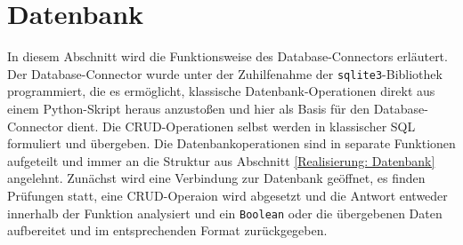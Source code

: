     \section{Datenbank} \label{Implementierung: Datenbank}
        In diesem Abschnitt wird die Funktionsweise des Database-Connectors erläutert.  
        Der Database-Connector wurde unter der Zuhilfenahme der \verb|sqlite3|-Bibliothek programmiert, die es ermöglicht, klassische Datenbank-Operationen direkt aus einem Python-Skript heraus anzustoßen und hier als Basis für den Database-Connector dient. Die CRUD-Operationen selbst werden in klassischer SQL formuliert und übergeben. Die Datenbankoperationen sind in separate Funktionen aufgeteilt und immer an die Struktur aus Abschnitt \ref*{Realisierung: Datenbank} angelehnt. Zunächst wird eine Verbindung zur Datenbank geöffnet, es finden Prüfungen statt, eine CRUD-Operaion wird abgesetzt und die Antwort entweder innerhalb der Funktion analysiert und ein \verb|Boolean| oder die übergebenen Daten aufbereitet und im entsprechenden Format zurückgegeben.
                

